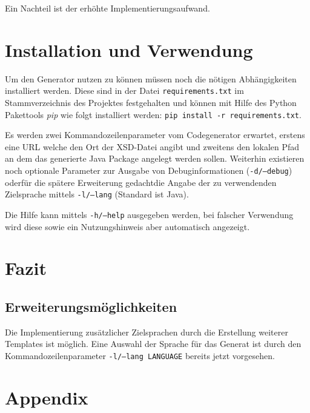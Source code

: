 \documentclass[a4paper]{scrartcl}
\begin{document}
    Ein Nachteil ist der erhöhte Implementierungsaufwand.

    \section{Installation und Verwendung}

    Um den Generator nutzen zu können müssen noch die nötigen Abhängigkeiten installiert werden. Diese sind in der Datei \texttt{requirements.txt} im Stammverzeichnis des Projektes festgehalten und können mit Hilfe des Python Pakettools \emph{pip} wie folgt installiert werden: \texttt{pip install -r requirements.txt}.

    Es werden zwei Kommandozeilenparameter vom Codegenerator erwartet, erstens eine \gls{URL} welche den Ort der \gls{XSD}-Datei angibt und zweitens den lokalen Pfad an dem das generierte Java Package angelegt werden sollen. Weiterhin existieren noch optionale Parameter zur Ausgabe von Debuginformationen (\texttt{-d/--debug}) oder\textemdash{}für die spätere Erweiterung gedacht\textemdash{}die Angabe der zu verwendenden Zielsprache mittels \texttt{-l/--lang} (Standard ist Java).

    Die Hilfe kann mittels \texttt{-h/--help} ausgegeben werden, bei falscher Verwendung wird diese sowie ein Nutzungshinweis aber automatisch angezeigt.

    \section{Fazit}

    \subsection{Erweiterungsmöglichkeiten}
    \label{sec:erweiterung}

    Die Implementierung zusätzlicher Zielsprachen durch die Erstellung weiterer Templates ist möglich. Eine Auswahl der Sprache für das Generat ist durch den Kommandozeilenparameter \texttt{-l/--lang LANGUAGE} bereits jetzt vorgesehen.

    \clearpage
    \section{Appendix}

    \printglossary[type=main,title={Glossar},toctitle={Glossar}]

    \printbibliography
\end{document}
